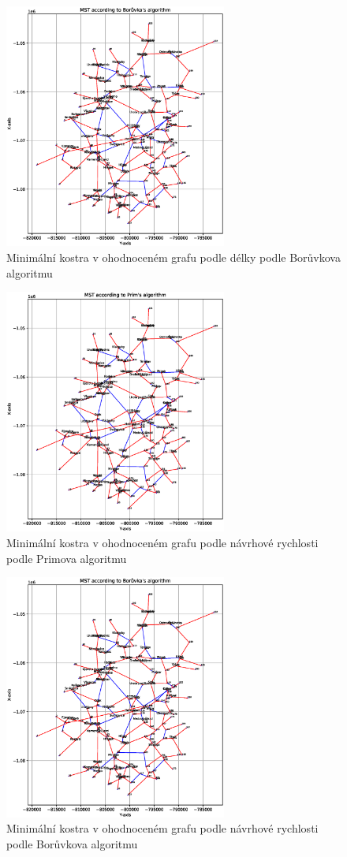 \begin{figure}[H]
    \centering
    \includegraphics[width=0.65\textwidth]{images/Figure_3_curvature.eps}
    \caption{Minimální kostra v ohodnoceném grafu podle délky podle Borůvkova algoritmu}
\end{figure}
\begin{figure}[H]
    \centering
    \includegraphics[width=0.65\textwidth]{images/Figure_2_curvature.eps}
    \caption{Minimální kostra v ohodnoceném grafu podle návrhové rychlosti podle Primova algoritmu}
\end{figure}
\begin{figure}[H]
    \centering
    \includegraphics[width=0.65\textwidth]{images/Figure_3_curvature.eps}
    \caption{Minimální kostra v ohodnoceném grafu podle návrhové rychlosti podle Borůvkova algoritmu}
\end{figure}